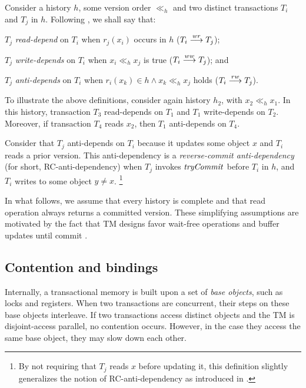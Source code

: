 Consider a history $h$, some version order $\ll_h$ and two distinct transactions $T_i$ and $T_j$ in $h$.
Following \cite{Adya99}, we shall say that:
\begin{compactitem}
\item $T_j$ \emph{read-depend} on $T_i$ when $r_j(x_i)$ occurs in $h$ ($T_i \wrdep T_j$);
\item $T_j$ \emph{write-depends} on $T_i$ when $x_i \ll_h x_j$ is true ($T_i \wwdep T_j$); and
\item $T_j$ \emph{anti-depends} on $T_i$ when $r_i(x_k) \in h \land x_k \ll_h x_j$ holds ($T_i \adep T_j$).
\end{compactitem}
To illustrate the above definitions, consider again history $h_2$, with $x_2 \ll_h x_1$.
In this history, transaction $T_3$ read-depends on $T_1$ and $T_1$ write-depends on $T_2$.
Moreover, if transaction $T_4$ reads $x_2$, then $T_1$ anti-depends on $T_4$.

Consider that $T_j$ anti-depends on $T_i$ because it updates some object $x$ and $T_i$ reads a prior version.
This anti-dependency is a \emph{reverse-commit anti-dependency} (for short, RC-anti-dependency) \cite{hans16} when $T_j$ invokes $\stmTryCommitFunction$ before $T_i$ in $h$, and $T_i$ writes to some object $y \neq x$.
%
\footnote{
  By not requiring that $T_j$ reads $x$ before updating it, this definition slightly generalizes the notion of RC-anti-dependency as introduced in \cite{hans16}.
}

In what follows, we assume that every history is complete and that read operation always returns a committed version.
These simplifying assumptions are motivated by the fact that TM designs favor wait-free operations and buffer updates until commit \cite{bookTM}.

\subsection{Contention and bindings}

Internally, a transactional memory is built upon a set of \emph{base objects}, such as locks and registers.
When two transactions are concurrent, their steps on these base objects interleave.
If two transactions access distinct objects and the TM is disjoint-access parallel, no contention occurs.
However, in the case they access the same base object, they may slow down each other.

